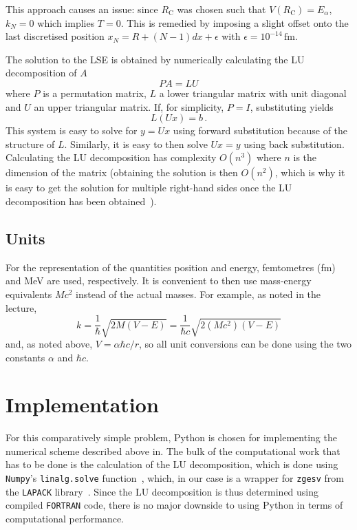 \documentclass[a4paper,DIV=12,english]{scrartcl}
\begin{document}
This approach causes an issue: since $R_\text{C}$ was chosen such that $V(R_\text{C}) = E_\alpha$, $k_N = 0$ which implies $T = 0$. This is remedied by imposing a slight offset onto the last discretised position $x_N = R + (N-1) dx + \epsilon$ with $\epsilon = 10^{-14}\,\text{fm}$.

The solution to the LSE is obtained by numerically calculating the LU decomposition of $A$
\begin{equation}
    P A  = L U
\end{equation}
where $P$ is a permutation matrix, $L$ a lower triangular matrix with unit diagonal and $U$ an upper triangular matrix. If, for simplicity, $P = I$, substituting yields
\begin{equation}
    L (Ux) = b\,.
\end{equation}
This system is easy to solve for $y = Ux$ using forward substitution because of the structure of $L$. Similarly, it is easy to then solve $Ux = y$ using back substitution. Calculating the LU decomposition has complexity $O(n^3)$ where $n$ is the dimension of the matrix (obtaining the solution is then $O(n^2)$, which is why it is easy to get the solution for multiple right-hand sides once the LU decomposition has been obtained~\cite{numerik}).

\subsection{Units}
For the representation of the quantities position and energy, femtometres (fm) and MeV are used, respectively. It is convenient to then use mass-energy equivalents $Mc^2$ instead of the actual masses. For example, as noted in the lecture,
\begin{equation}
    k = \frac{1}{\hbar} \sqrt{2 M (V - E)} = \frac{1}{\hbar c} \sqrt{2 (Mc^2) (V - E)} 
\end{equation}
and, as noted above, $V = \alpha \hbar c / r$, so all unit conversions can be done using the two constants $\alpha$ and $\hbar c$.

\section{Implementation}
For this comparatively simple problem, Python is chosen for implementing the numerical scheme described above in. The bulk of the computational work that has to be done is the calculation of the LU decomposition, which is done using \texttt{Numpy}'s \texttt{linalg.solve} function~\cite{harris2020array}, which, in our case is a wrapper for \texttt{zgesv} from the \texttt{LAPACK} library~\cite{laug}. Since the LU decomposition is thus determined using compiled \texttt{FORTRAN} code, there is no major downside to using Python in terms of computational performance.
\end{document}

